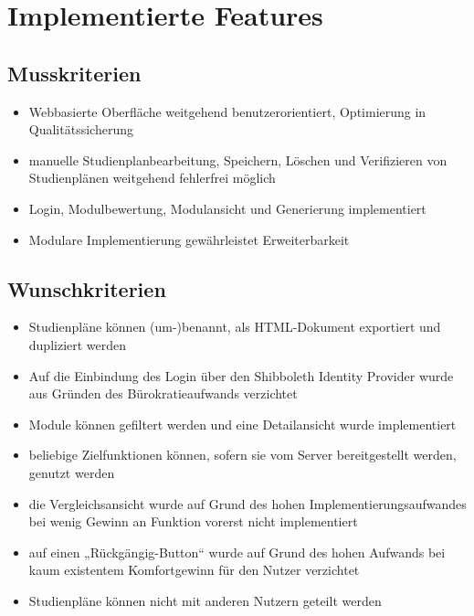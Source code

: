 \section{Implementierte Features}
\subsection{Musskriterien}
\begin{itemize}[nosep]
	\item Webbasierte Oberfläche weitgehend benutzerorientiert, Optimierung in Qualitätssicherung
	\item manuelle Studienplanbearbeitung, Speichern, Löschen und Verifizieren von Studienplänen weitgehend fehlerfrei möglich
	\item Login, Modulbewertung, Modulansicht und Generierung implementiert
	\item Modulare Implementierung gewährleistet Erweiterbarkeit
	\end{itemize}
\subsection{Wunschkriterien}
	\begin{itemize}[nosep]
	\item Studienpläne können (um-)benannt, als HTML-Dokument exportiert und dupliziert werden
	\item Auf die Einbindung des Login über den Shibboleth Identity Provider wurde aus Gründen des Bürokratieaufwands verzichtet
	\item Module können gefiltert werden und eine Detailansicht wurde implementiert
	\item beliebige Zielfunktionen können, sofern sie vom Server bereitgestellt werden, genutzt werden
	\item die Vergleichsansicht wurde auf Grund des hohen Implementierungsaufwandes bei wenig Gewinn an Funktion vorerst nicht implementiert
	\item  auf einen „Rückgängig-Button“ wurde auf Grund des hohen Aufwands bei kaum existentem Komfortgewinn für den Nutzer verzichtet
	\item Studienpläne können nicht mit anderen Nutzern geteilt werden
	\end{itemize}